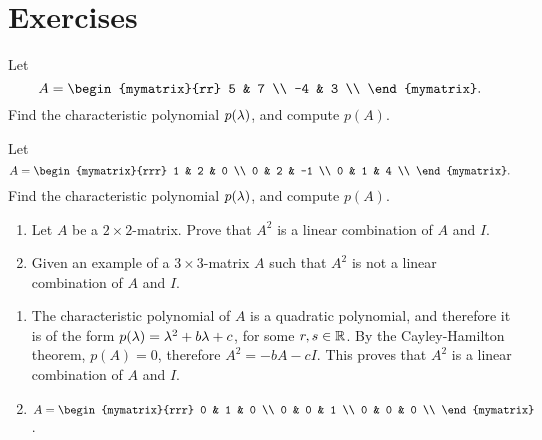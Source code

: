 \section*{Exercises}


\begin{ex}
  Let
  \begin{equation*}
    A = \begin{mymatrix}{rr}
      5 & 7 \\
      -4 & 3 \\
    \end{mymatrix}.
  \end{equation*}
  Find the characteristic polynomial $p(\lambda)$, and compute
  $p(A)$.
\end{ex}

\begin{ex}
  Let
  \begin{equation*}
    A = \begin{mymatrix}{rrr}
      1 & 2 & 0 \\
      0 & 2 & -1 \\
      0 & 1 & 4 \\
    \end{mymatrix}.
  \end{equation*}
  Find the characteristic polynomial $p(\lambda)$, and compute
  $p(A)$.
\end{ex}

\begin{ex}
  \begin{enumerate}
  \item Let $A$ be a $2\times 2$-matrix. Prove that $A^2$ is a linear
    combination of $A$ and $I$.
  \item Given an example of a $3\times 3$-matrix $A$ such that $A^2$
    is not a linear combination of $A$ and $I$.
  \end{enumerate}
  \begin{sol}
    \begin{enumerate}
    \item The characteristic polynomial of $A$ is a quadratic
      polynomial, and therefore it is of the form
      $p(\lambda) = \lambda^2 + b\lambda + c$, for some
      $r,s\in\mathbb{R}$. By the Cayley-Hamilton theorem, $p(A)=0$, therefore
      $A^2 = -bA - cI$. This proves that $A^2$ is a linear combination
      of $A$ and $I$.
    \item $A=\begin{mymatrix}{rrr}
        0 & 1 & 0 \\
        0 & 0 & 1 \\
        0 & 0 & 0 \\
      \end{mymatrix}$.
    \end{enumerate}
  \end{sol}
\end{ex}

